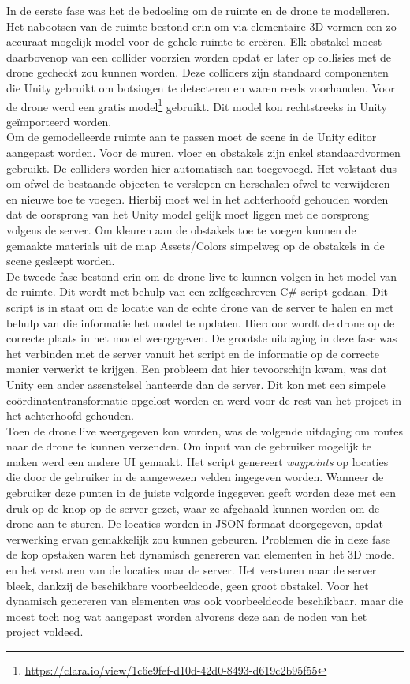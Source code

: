 In de eerste fase was het de bedoeling om de ruimte en de drone te modelleren. Het nabootsen van de ruimte bestond erin om via elementaire 3D-vormen een zo accuraat mogelijk model voor de gehele ruimte te cre\"eren. Elk obstakel moest daarbovenop van een collider voorzien worden opdat er later op collisies met de drone gecheckt zou kunnen worden. Deze colliders zijn standaard componenten die Unity gebruikt om botsingen te detecteren en waren reeds voorhanden. Voor de drone werd een gratis model\footnote{\url{https://clara.io/view/1c6e9fef-d10d-42d0-8493-d619c2b95f55}} gebruikt. Dit model kon rechtstreeks in Unity ge\"importeerd worden. \\

Om de gemodelleerde ruimte aan te passen moet de scene in de Unity editor aangepast worden. Voor de muren, vloer en obstakels zijn enkel standaardvormen gebruikt. De colliders worden hier automatisch aan toegevoegd. Het volstaat dus om ofwel de bestaande objecten te verslepen en herschalen ofwel te verwijderen en nieuwe toe te voegen. Hierbij moet wel in het achterhoofd gehouden worden dat de oorsprong van het Unity model gelijk moet liggen met de oorsprong volgens de server. Om kleuren aan de obstakels toe te voegen kunnen de gemaakte materials uit de map Assets/Colors simpelweg op de obstakels in de scene gesleept worden.\\

De tweede fase bestond erin om de drone live te kunnen volgen in het model van de ruimte. Dit wordt met behulp van een zelfgeschreven C\# script gedaan. Dit script is in staat om de locatie van de echte drone van de server te halen en met behulp van die informatie het model te updaten. Hierdoor wordt de drone op de correcte plaats in het model weergegeven. De grootste uitdaging in deze fase was het verbinden met de server vanuit het script en de informatie op de correcte manier verwerkt te krijgen. Een probleem dat hier tevoorschijn kwam, was dat Unity een ander assenstelsel hanteerde dan de server. Dit kon met een simpele co\"ordinatentransformatie opgelost worden en werd voor de rest van het project in het achterhoofd gehouden.\\

Toen de drone live weergegeven kon worden, was de volgende uitdaging om routes naar de drone te kunnen verzenden. Om input van de gebruiker mogelijk te maken werd een andere UI gemaakt. Het script genereert \textit{waypoints} op locaties die door de gebruiker in de aangewezen velden ingegeven worden. Wanneer de gebruiker deze punten in de juiste volgorde ingegeven geeft worden deze met een druk op de knop op de server gezet, waar ze afgehaald kunnen worden om de drone aan te sturen. De locaties worden in JSON-formaat doorgegeven, opdat verwerking ervan gemakkelijk zou kunnen gebeuren. Problemen die in deze fase de kop opstaken waren het dynamisch genereren van elementen in het 3D model en het versturen van de locaties naar de server. Het versturen naar de server bleek, dankzij de beschikbare voorbeeldcode, geen groot obstakel. Voor het dynamisch genereren van elementen was ook voorbeeldcode beschikbaar, maar die moest toch nog wat aangepast worden alvorens deze aan de noden van het project voldeed.\\

